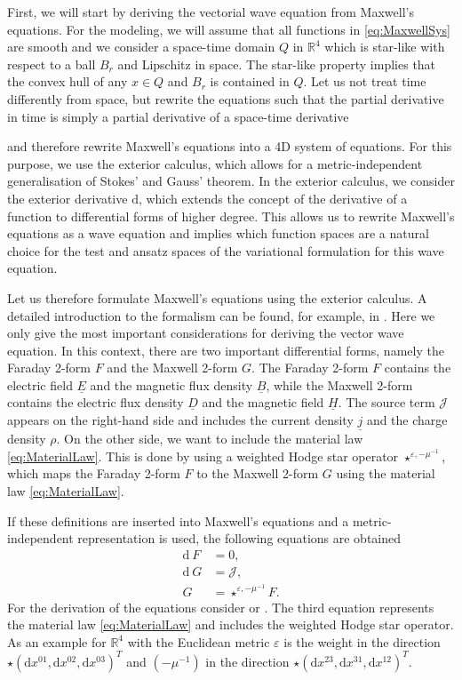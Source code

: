 \documentclass[a4paper,11pt]{article}
\newcommand{\R}{\mathbb R}
\renewcommand{\vec}[1]{\underline{#1}}
\begin{document}
First, we will start by deriving the vectorial wave equation from Maxwell's equations. For the modeling, we will assume that all functions in \eqref{eq:MaxwellSys} are smooth and we consider a space-time domain $Q$ in $\R^4$ which is star-like with respect to a ball $B_r$ and Lipschitz in space. The star-like property implies {that} the convex hull of any {$x\in Q$} and $B_r$ is contained in  {$Q$}.  Let us not treat time differently from space, but rewrite the equations such that the partial derivative in time is simply a partial derivative of a space-time derivative
{and therefore rewrite Maxwell's equations into a 4D system of equations. For this purpose, we use the exterior calculus, which allows for a metric-independent generalisation of Stokes' and Gauss' theorem. In the exterior calculus, we consider the exterior derivative $\mathrm{d}$, which extends the concept of the derivative of a function to differential forms of higher degree. This allows us to rewrite Maxwell's equations as a wave equation and implies which function spaces are a natural choice for the test and ansatz spaces of the variational formulation for this wave equation.
	
	Let us therefore formulate Maxwell's equations using the exterior calculus. A detailed introduction to the formalism can be found, for example, in \cite{fortney,lang}. Here we only give the most important considerations for deriving the vector wave equation.  In this context, there are two important differential forms, namely the Faraday 2-form $F$ and the Maxwell 2-form $G$. The Faraday 2-form $F$ contains the electric field $\vec E$ and the magnetic flux density $\vec B$, while the Maxwell 2-form contains the electric flux density $\vec D$ and the magnetic field $\vec H$. The source term $\mathcal{J}$ appears on the right-hand side and includes the current density $\vec j$ and the charge density $\rho$. On the other side, we want to include the material law \eqref{eq:MaterialLaw}. This is done by using a weighted Hodge star operator $\star^{\varepsilon,-\mu^{-1}}$, which maps the Faraday 2-form $F$ to the Maxwell 2-form $G$ using the material law \eqref{eq:MaterialLaw}.
	
	If these definitions are inserted into Maxwell's equations and a metric-independent representation is used, the following equations are obtained
	\begin{align}
		\nonumber
		\mathrm{d}\ F &= 0,\\
		\label{eqn:Maxwell4D}
		\mathrm{d}\ G &= \mathcal{J},\\
		\nonumber
		G &= \star^{\varepsilon,-\mu^{-1}} F.
	\end{align}
	For the derivation of the equations consider \cite{stern} or \cite[p.~135]{post1962formal}. The third equation represents the material law \eqref{eq:MaterialLaw} and includes the weighted Hodge star operator. As an example for $\R^4$ with the Euclidean metric $\varepsilon$ is the weight in the direction $\star(\mathrm{d}x^{01},\mathrm{d}x^{02},\mathrm{d}x^{03})^T$ and $(-\mu^{-1})$ in the direction $\star(\mathrm{d}x^{23},\mathrm{d}x^{31},\mathrm{d}x^{12})^T$. 
	
}
\end{document}
